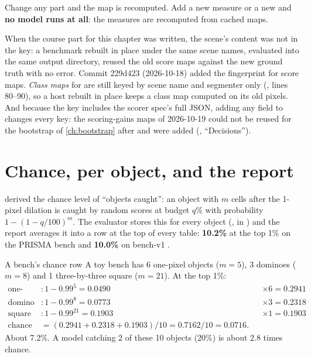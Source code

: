 Change any part and the map is recomputed. Add a new measure or a new  and \textbf{no model runs at all}:
the measures are recomputed from cached maps.

\begin{sourcenote}
When the course part for this chapter was written, the scene's content was not in the key: a benchmark rebuilt in
place under the same scene names, evaluated into the same output directory, reused the old score maps against the new
ground truth with no error. Commit 229d423 (2026-10-18) added the fingerprint for score maps. \emph{Class maps} for
 are still keyed by scene name and segmenter only (,  lines 80--90), so
a host rebuilt in place keeps a class map computed on its old pixels. And because the key includes the scorer spec's
full JSON, adding any field to  changes every key: the scoring-gains maps of 2026-10-19 could not be
reused for the bootstrap of \cref{ch:bootstrap} after  and  were added
(, ``Decisions'').
\end{sourcenote}

\section{Chance, per object, and the report}\label{sec:runeval:chance}

 derived the chance level of ``objects caught'': an object with $m$ cells after the 1-pixel dilation
is caught by random scores at budget $q$\% with probability $1 - (1 - q/100)^m$. The evaluator stores this for every
object (,  in ) and the report averages it into a 
row at the top of every table: \textbf{10.2\%} at the top 1\% on the PRISMA bench and \textbf{10.0\%} on bench-v1
\hfil{}\hfilneg{}.

\begin{worked}[label={we:runeval:chance}]{A bench's chance row}
A toy bench\tagA{} has 6 one-pixel objects ($m = 5$), 3 dominoes ($m = 8$) and 1 three-by-three square ($m = 21$). At
the top 1\%:
\begin{align*}
\text{one-pixel} &: 1 - 0.99^5 = 0.0490 && \times 6 = 0.2941\\
\text{domino} &: 1 - 0.99^8 = 0.0773 && \times 3 = 0.2318\\
\text{square} &: 1 - 0.99^{21} = 0.1903 && \times 1 = 0.1903\\
\text{chance row} &= (0.2941 + 0.2318 + 0.1903) / 10 = 0.7162 / 10 = 0.0716.
\end{align*}
About 7.2\%. A model catching 2 of these 10 objects (20\%) is about 2.8 times chance.
\end{worked}

